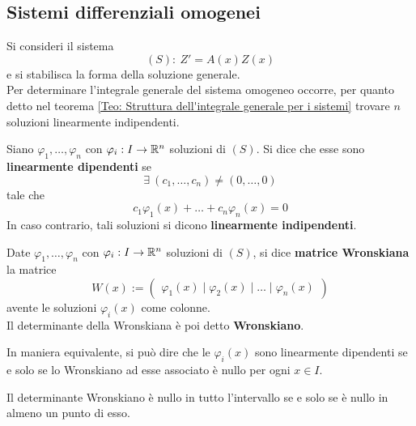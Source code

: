\subsection{Sistemi differenziali omogenei}
Si consideri il sistema
\begin{equation*}
    (S):\ Z'= A(x)Z(x)
\end{equation*}
e si stabilisca la forma della soluzione generale.\\
Per determinare l'integrale generale del sistema omogeneo occorre, per quanto detto nel teorema \ref{Teo: Struttura dell'integrale generale per i sistemi} trovare $n$ soluzioni linearmente indipendenti.
\begin{definition} \label{Def: Soluzioni linearmente dipendenti/indipendenti}
    Siano $\varphi_1, \dots, \varphi_n$ con $\varphi_i:I \to \mathbb{R}^n$ 
    soluzioni di $(S)$. Si dice che esse sono \textbf{linearmente dipendenti} se 
    \begin{equation*}
        \exists\ (c_1, \dots, c_n) \neq (0, \dots, 0)
    \end{equation*}
    tale che
    \begin{equation*}
        c_1 \varphi_1(x)+ \dots
        +c_n \varphi_n(x) = 0
    \end{equation*}
    In caso contrario, tali soluzioni si dicono \textbf{linearmente indipendenti}.
\end{definition}
\begin{definition} \label{Def: Matrice Wronskiana}
    Date $\varphi_1, \dots, \varphi_n$ con $\varphi_i:I \to \mathbb{R}^n$ 
    soluzioni di $(S)$, si dice \textbf{matrice Wronskiana} la matrice
    \begin{equation*}
        W(x):= \begin{pmatrix}
        \varphi_1(x)\mid \varphi_2(x)\mid  \dots \mid \varphi_n(x)
        \end{pmatrix}
    \end{equation*}
avente le soluzioni $\varphi_i(x)$ come colonne.\\
Il determinante della Wronskiana è poi detto \textbf{Wronskiano}.
\end{definition}
In maniera equivalente, si può dire che le $\varphi_i(x)$ sono linearmente dipendenti se e solo se lo Wronskiano ad esse associato è nullo per ogni $x \in I$.
\begin{proposition} \label{Prop: Wronskiano nullo sse nullo in I}
    Il determinante Wronskiano è nullo in tutto l'intervallo se e solo se è nullo in almeno un punto di esso.
\end{proposition}
